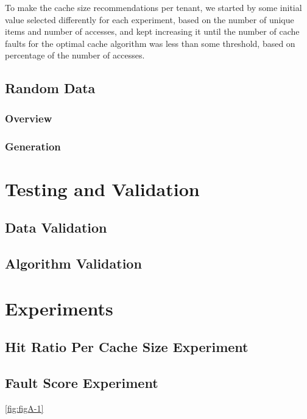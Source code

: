 To make the cache size recommendations per tenant, we started by some initial value selected differently
for each experiment, based on the number of unique items and number of accesses, and kept increasing it 
until the number of cache faults for the optimal cache algorithm was less than some threshold, based 
on percentage of the number of accesses.

\subsection{Random Data}

\subsubsection{Overview}

\subsubsection{Generation}

\section{Testing and Validation}

\subsection{Data Validation}

\subsection{Algorithm Validation}

\section{Experiments}

\subsection{Hit Ratio Per Cache Size Experiment}

\subsection{Fault Score Experiment}

\lipsum[1-3]

\lipsum[1-1] \ref{fig:figA-1}

